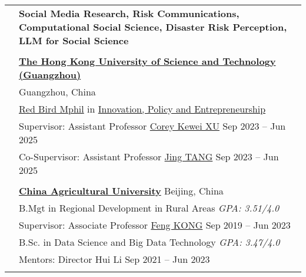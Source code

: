 \documentclass[letterpaper, 11pt]{article}
\begin{document}
\begin{longtable}{p{1.3in}p{4.8in}}



\nohyphens{\color{RoyalBlue}{Research Interests}}
& \bf{Social Media Research, Risk Communications, Computational Social Science, Disaster Risk Perception, LLM for Social Science}\\
& \\



\color{RoyalBlue}{Education} 
& \textbf{\href{https://www.hkust-gz.edu.cn/}{The Hong Kong University of Science and Technology (Guangzhou)}} \\
& \hfill Guangzhou, China \\
& \href{https://www.hkust-gz.edu.cn/academics/teaching-and-learning-innovation/red-bird-mphil-program/}{Red Bird Mphil} in \href{https://www.hkust-gz.edu.cn/academics/hubs-and-thrust-areas/society-hub/innovation-policy-and-entrepreneurship/}{Innovation, Policy and Entrepreneurship} \\
& Supervisor: Assistant Professor \href{https://facultyprofiles.hkust-gz.edu.cn/faculty-personal-page/XU-Kewei/coreyxu}{Corey Kewei XU}  \hfill Sep 2023 -- Jun 2025\\
& Co-Supervisor: Assistant Professor \href{https://facultyprofiles.hkust-gz.edu.cn/faculty-personal-page/TANG-Jing/jingtang}{Jing TANG}  \hfill Sep 2023 -- Jun 2025\\
& \\

& \textbf{\href{http://en.cau.edu.cn/}{China Agricultural University}} \hfill Beijing, China\\
& B.Mgt in Regional Development in Rural Areas \hfill{\it GPA: 3.51/4.0} \\
& Supervisor: Associate Professor \href{https://cohd.cau.edu.cn/art/2020/11/27/art_48059_998984.html}{Feng KONG}  \hfill Sep 2019 -- Jun 2023\\
& B.Sc. in Data Science and Big Data Technology  \hfill{\it GPA: 3.47/4.0} \\
& Mentors: Director Hui Li \hfill Sep 2021 -- Jun 2023 \\
& \\



\end{longtable}
\end{document}
